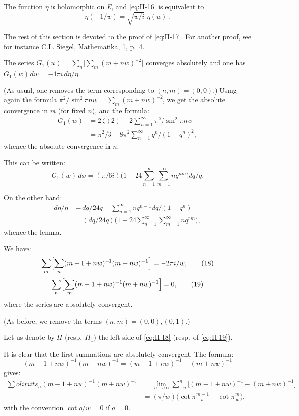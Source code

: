 The function $\eta$ is holomorphic on $E$, and \eqref{eq:II-16} is
equivalent to
\[
\eta(-1/w)=\sqrt{w/i}\;\eta(w)\,.
\tag{17}\label{eq:II-17}
\]

The rest of this section is devoted to the proof of \eqref{eq:II-17}. For
another proof, see for instance C.L. Siegel, Mathematika, 1, p.~4.

\begin{lemma}\label{lem:II-1}
The series $G_{1}(w)=\sum_{n}\bigl[\sum_{m}(m+nw)^{-2}\bigr]$ converges
absolutely and one has $G_{1}(w)\,dw=-4\pi i\,d\eta/\eta$.
\end{lemma}

(As usual, one removes the term corresponding to $(n,m)=(0,0)$.) Using
again the formula $\pi^{2}/\sin^{2}\pi nw=\sum_{m}(m+nw)^{-2}$, we get the
absolute convergence in $m$ (for fixed $n$), and the formula:
\[
\begin{aligned}
G_{1}(w)
&=2\,\zeta(2)+2\sum_{n=1}^{\infty}\pi^{2}/\sin^{2}\pi nw\\
&=\pi^{2}/3-8\pi^{2}\sum_{n=1}^{\infty}q^{n}/(1-q^{n})^{2},
\end{aligned}
\]
whence the absolute convergence in $n$.

This can be written:
\[
G_{1}(w)\,dw=(\pi/6i)\bigl(1-24\sum_{n=1}^{\infty}\sum_{m=1}^{\infty}
nq^{nm}\bigr)dq/q.
\]

On the other hand:
\[
\begin{aligned}
d\eta/\eta
&=dq/24q-\sum_{n=1}^{\infty}nq^{n-1}dq/(1-q^{n})\\
&=(dq/24q)\bigl(1-24\sum_{n=1}^{\infty}\sum_{m=1}^{\infty}nq^{nm}\bigr),
\end{aligned}
\]
whence the lemma.

\begin{lemma}\label{lem:II-2}
We have:
\[
\sum_{m}\Bigl[\sum_{n}(m-1+nw)^{-1}(m+nw)^{-1}\Bigr]=-2\pi i/w,
\tag{18}\label{eq:II-18}
\]
\[
\sum_{n}\Bigl[\sum_{m}(m-1+nw)^{-1}(m+nw)^{-1}\Bigr]=0,
\tag{19}\label{eq:II-19}
\]
where the series are absolutely convergent.
\end{lemma}

(As before, we remove the terms $(n,m)=(0,0),(0,1)$.)

Let us denote by $H$ (resp.\ $H_{1}$) the left side of \eqref{eq:II-18}
(resp.\ of \eqref{eq:II-19}).

It is clear that the first summations are absolutely convergent. The formula:
\[
(m-1+nw)^{-1}(m+nw)^{-1}=(m-1+nw)^{-1}-(m+nw)^{-1}
\]
gives:
\[
\begin{aligned}
\sum
olimits_{n}(m-1+nw)^{-1}(m+nw)^{-1}
&=\lim_{n\to\infty}\sum_{-n}^{n}\bigl[(m-1+nw)^{-1}-(m+nw)^{-1}\bigr]\\
&=(\pi/w)\bigl(\cot\pi\tfrac{m-1}{w}-\cot\pi\tfrac{m}{w}\bigr),
\end{aligned}
\]
with the convention $\cot a/w=0$ if $a=0$.

